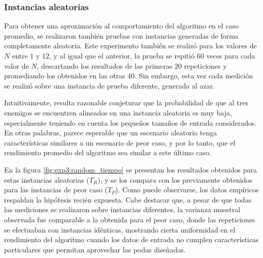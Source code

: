         \subsubsection{Instancias aleatorias}

            Para obtener una aproximación al comportamiento del algoritmo en el caso promedio, se realizaron también pruebas con instancias generadas de forma completamente aleatoria. Este experimento también se realizó para los valores de $N$ entre $1$ y $12$, y al igual que el anterior, la prueba se repitió $60$ veces para cada valor de $N$, descartando los resultados de las primeras $20$ repeticiones y promediando los obtenidos en las otras $40$. Sin embargo, esta vez cada medición se realizó sobre una instancia de prueba diferente, generada al azar.

            Intuitivamente, resulta razonable conjeturar que la probabilidad de que al tres enemigos se encuentren alineados en una instancia aleatoria es muy baja, especialmente teniendo en cuenta los pequeños tamaños de entrada considerados. En otras palabras, parece esperable que un escenario aleatorio tenga características similares a un escenario de peor caso, y por lo tanto, que el rendimiento promedio del algoritmo sea similar a este último caso.

            En la figura \ref{fig:exp3:random_tiempo} se presentan los resultados obtenidos para estas instancias aleatorias ($T_R$), y se los compara con los previamente obtenidos para las instancias de peor caso ($T_P$). Como puede observarse, los datos empíricos respaldan la hipótesis recién expuesta. Cabe destacar que, a pesar de que todas las mediciones se realizaron sobre instancias diferentes, la varianza muestral observada fue comparable a la obtenida para el peor caso, donde las repeticiones se efectuaban con instancias idénticas, mostrando cierta uniformidad en el rendimiento del algoritmo cuando los datos de entrada no cumplen características particulares que permitan aprovechar las podas diseñadas.

